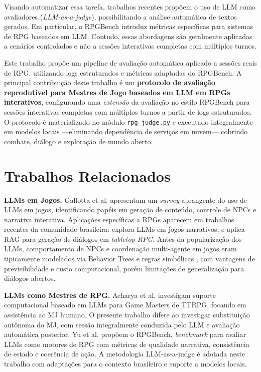 \documentclass[12pt]{article}
\begin{document}
Visando automatizar essa tarefa, trabalhos recentes propõem o uso de LLM como avaliadores (\textit{LLM-as-a-judge}), possibilitando a análise automática de textos gerados. Em particular, o RPGBench \cite{yu:2025} introduz métricas específicas para sistemas de RPG baseados em LLM. Contudo, essas abordagens são geralmente aplicadas a cenários controlados e não a sessões interativas completas com múltiplos turnos.

Este trabalho propõe um pipeline de avaliação automática aplicado a sessões reais de RPG, utilizando logs estruturados e métricas adaptadas do RPGBench. A principal contribuição deste trabalho é um \textbf{protocolo de avaliação reprodutível para Mestres de Jogo baseados em LLM em RPGs interativos}, configurando uma \textit{extensão} da avaliação no estilo RPGBench \cite{yu:2025} para sessões interativas completas com múltiplos turnos a partir de logs estruturados. O protocolo é materializado no módulo \texttt{rpg\_judge.py} e executado integralmente em modelos locais ---eliminando dependência de serviços em nuvem--- cobrindo combate, diálogo e exploração de mundo aberto.

\section{Trabalhos Relacionados}

\textbf{LLMs em Jogos.}
Gallotta et al. \cite{gallotta:2024} apresentam um \textit{survey} abrangente do uso de LLMs em jogos, identificando papéis em geração de conteúdo, controle de NPCs e narrativa interativa. Aplicações específicas a RPGs aparecem em trabalhos recentes da comunidade brasileira: \cite{sbgames:llm:2025} explora LLMs em jogos narrativos, e \cite{sbgames:tabletop:2025} aplica RAG para geração de diálogos em \textit{tabletop RPG}. Antes da popularização dos LLMs, comportamento de NPCs e coordenação multi-agente em jogos eram tipicamente modelados via Behavior Trees e regras simbólicas \cite{agis:2020}, com vantagens de previsibilidade e custo computacional, porém limitações de generalização para diálogos abertos.

\textbf{LLMs como Mestres de RPG.}
Acharya et al. \cite{acharya:2023} investigam suporte computacional baseado em LLMs para Game Masters de TTRPG, focando em assistência ao MJ humano. O presente trabalho difere ao investigar substituição autônoma do MJ, com sessão integralmente conduzida pelo LLM e avaliação automática posterior. Yu et al. \cite{yu:2025} propõem o RPGBench, \textit{benchmark} para avaliar LLMs como motores de RPG com métricas de qualidade narrativa, consistência de estado e coerência de ação. A metodologia LLM-as-a-judge é adotada neste trabalho com adaptações para o contexto brasileiro e suporte a modelos locais.
\end{document}

